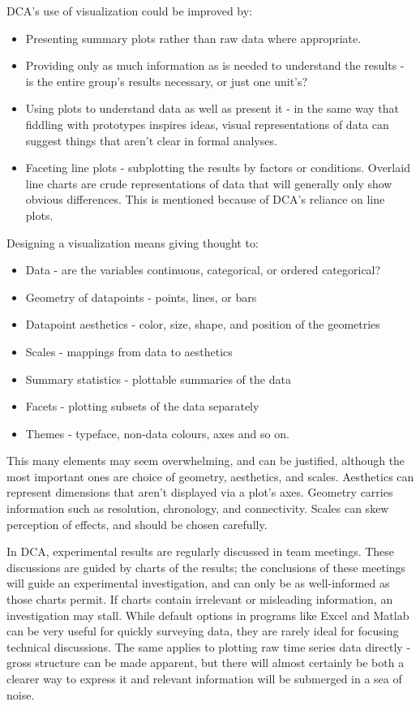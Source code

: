 \documentclass[11pt,a4paper,article]{memoir} %
\begin{document}
DCA's use of visualization could be improved by:
\begin{itemize}
\item Presenting summary plots rather than raw data where appropriate.
\item Providing only as much information as is needed to understand the results - is the entire group's results necessary, or just one unit's?
\item Using plots to understand data as well as present it - in the same way that fiddling with prototypes inspires ideas, visual representations of data can suggest things that aren't clear in formal analyses.
\item Faceting line plots - subplotting the results by factors or conditions. Overlaid line charts are crude representations of data that will generally only show obvious differences. This is mentioned because of DCA's reliance on line plots.
\end{itemize}
Designing a visualization means giving thought to:
\begin{itemize}
\item Data - are the variables continuous, categorical, or ordered categorical?
\item Geometry of datapoints - points, lines, or bars
\item Datapoint aesthetics - color, size, shape, and position of the geometries
\item Scales - mappings from data to aesthetics
\item Summary statistics - plottable summaries of the data
\item Facets - plotting subsets of the data separately
\item Themes - typeface, non-data colours, axes and so on.
\end{itemize}
This many elements may seem overwhelming, and can be justified, although the most important ones are choice of geometry, aesthetics, and scales. Aesthetics can represent dimensions that aren't displayed via a plot's axes. Geometry carries information such as resolution, chronology,  and connectivity. Scales can skew perception of effects, and should be chosen carefully.

 In DCA, experimental results are regularly discussed in team meetings. These discussions are guided by charts of the results; the conclusions of these meetings will guide an experimental investigation, and can only be as well-informed as those charts permit. If charts contain irrelevant or misleading information, an investigation may stall.
  While default options in programs like Excel and Matlab can be very useful for quickly surveying data, they are rarely ideal for focusing technical discussions. The same applies to plotting raw time series data directly - gross structure can be made apparent, but there will almost certainly be both a clearer way to express it and relevant information will be submerged in a sea of noise.
\end{document}
